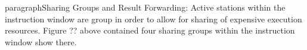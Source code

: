 
paragraph{Sharing Groups and Result Forwarding: }
Active stations within the instruction window are group in order
to allow for sharing of expensive execution resources.
Figure ?? above contained four sharing groups within the instruction
window show there.
